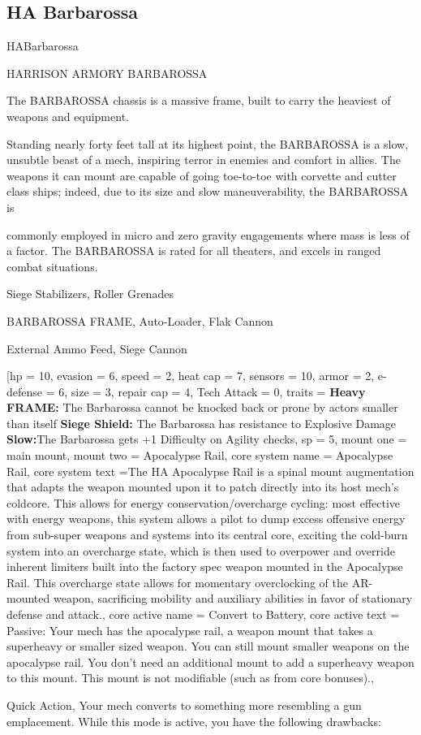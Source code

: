 \subsection{HA Barbarossa}
\begin{mech}{HA}{Barbarossa}

                           HARRISON ARMORY BARBAROSSA

The BARBAROSSA chassis is a massive frame, built to carry the heaviest of weapons and equipment.

Standing nearly forty feet tall at its highest point, the BARBAROSSA is a slow, unsubtle beast of a mech,
inspiring terror in enemies and comfort in allies. The weapons it can mount are capable of going toe-to-toe
with corvette and cutter class ships; indeed, due to its size and slow maneuverability, the BARBAROSSA is




commonly employed in micro and zero gravity engagements where mass is less of a factor. The
BARBAROSSA is rated for all theaters, and excels in ranged combat situations.

\begin{license}
\item Siege Stabilizers, Roller Grenades
\item BARBAROSSA FRAME, Auto-Loader, Flak Cannon
\item External Ammo Feed, Siege Cannon
\end{license}

\frameBox
[hp = 10,
evasion = 6,
speed = 2,
heat cap = 7,
sensors = 10,
armor = 2,
e-defense = 6,
size = 3,
repair cap = 4,
Tech Attack = 0,
traits = {\textbf{Heavy FRAME:} The Barbarossa cannot be knocked back or prone by actors smaller than itself
\textbf{Siege Shield:} The Barbarossa has resistance to Explosive Damage
\textbf{Slow:}The Barbarossa gets +1 Difficulty on Agility checks},
sp = 5,
mount one = main mount,
mount two = Apocalypse Rail,
core system name = Apocalypse Rail,
core system text ={The HA Apocalypse Rail is a spinal mount augmentation that adapts the weapon mounted upon it to patch directly into its host mech’s coldcore. This allows for energy conservation/overcharge cycling: most effective with energy weapons, this system allows a pilot to dump excess offensive energy from sub-super weapons and systems into its central core, exciting the cold-burn system into an overcharge state, which is then used to overpower and override inherent limiters built into the factory spec weapon mounted in the Apocalypse Rail. This overcharge state allows for momentary overclocking of the AR-mounted weapon, sacrificing mobility and auxiliary abilities in favor of stationary defense and attack.},
core active name = Convert to Battery,
core active text =
{Passive: Your mech has the apocalypse rail, a weapon mount that takes a superheavy or smaller sized weapon. You can still mount smaller weapons on the apocalypse rail. You don’t need an additional mount to add a superheavy weapon to this mount. This mount is not modifiable (such as from core bonuses).},
{Quick Action,
Your mech converts to something more resembling a gun emplacement. While this mode is active, you have the following drawbacks:

}
\end{mech}
